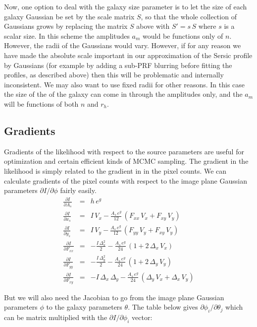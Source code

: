 \documentclass[modern]{aastex62}
\newcommand{\dx}{\Delta_x}
\newcommand{\dy}{\Delta_y}
\begin{document}
Now, one option to deal with the galaxy size parameter is to let the size of each galaxy Gaussian be set by the scale matrix $S$, so that the whole collection of Gaussians grows by replacing the matrix $S$ above with $S'=s\,S$ where $s$ is a scalar size.
In this scheme the amplitudes $a_m$ would be functions only of $n$.
However, the radii of the Gaussians would vary.
However, if for any reason we have made the absolute scale important in our approximation of the Sersic profile by Gaussians (for example by adding a sub-PRF blurring before fitting the profiles, as described above) then this will be problematic and internally inconsistent.
We may also want to use fixed radii for other reasons.
In this case the size of the of the galaxy can come in through the amplitudes only, and the $a_m$ will be functions of both $n$ and $r_h$.


\subsection{Gradients}
Gradients of the likelihood with respect to the source parameters are useful for optimization and certain efficient kinds of MCMC sampling.
The gradient in the likelihood is simply related to the gradient in in the pixel counts.
We can calculate gradients of the pixel counts with respect to the  image plane Gaussian parameters $\partial I/\partial \phi$ fairly easily.
\begin{eqnarray}
\frac{\partial I}{\partial A_s} & = & h \, e^g \\
\frac{\partial I}{\partial x_s} & = & I \, V_x - \frac{A_s \, e^g}{12} \, (F_{xx} \, V_x + F_{xy} \, V_y) \\
\frac{\partial I}{\partial y_s} & = & I \, V_y - \frac{A_s \, e^g}{12} \,  (F_{yy} \, V_y + F_{xy} \, V_y) \\
\frac{\partial I}{\partial F_{xx}} & = & - \frac{I \, \dx^2}{2} - \frac{A_s \, e^g}{24} \,  (1 + 2\, \dx \, V_x) \\
\frac{\partial I}{\partial F_{yy}} & = & - \frac{I \, \dy^2}{2} - \frac{A_s \, e^g}{24} \,  (1 + 2\, \dy \, V_y) \\
\frac{\partial I}{\partial F_{xy}} & = & - {I \, \dx\, \dy} - \frac{A_s \, e^g}{24} \,  (\dy \, V_x + \dx \, V_y)
\end{eqnarray}

But we will also need the Jacobian to go from the image plane Gaussian parameters $\phi$ to the galaxy parameters $\theta$.
The table below gives $\partial \phi_i / \partial \theta_j$ which can be matrix multiplied with the $\partial I / \partial \phi_i$ vector:
\end{document}
